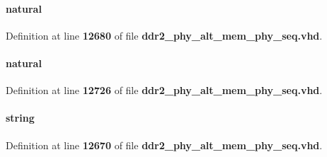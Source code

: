 \paragraph[{D\+W\+I\+D\+T\+H\+\_\+\+R\+A\+T\+IO}]{ {\bfseries \textcolor{vhdlchar}{ }} {\bfseries \textcolor{comment}{natural}\textcolor{vhdlchar}{ }} \hspace{0.3cm}{\ttfamily [Generic]}}\label{classddr2__phy__alt__mem__phy__seq_af28fead9270d0cdddf2692beba1d213f}


Definition at line {\bf 12680} of file {\bf ddr2\+\_\+phy\+\_\+alt\+\_\+mem\+\_\+phy\+\_\+seq.\+vhd}.

\paragraph[{E\+N\+\_\+\+O\+CT}]{ {\bfseries \textcolor{vhdlchar}{ }} {\bfseries \textcolor{comment}{natural}\textcolor{vhdlchar}{ }} \hspace{0.3cm}{\ttfamily [Generic]}}\label{classddr2__phy__alt__mem__phy__seq_a19426c180bed9a86acb8dd5fd27facc5}


Definition at line {\bf 12726} of file {\bf ddr2\+\_\+phy\+\_\+alt\+\_\+mem\+\_\+phy\+\_\+seq.\+vhd}.

\paragraph[{F\+A\+M\+I\+LY}]{ {\bfseries \textcolor{vhdlchar}{ }} {\bfseries \textcolor{comment}{string}\textcolor{vhdlchar}{ }} \hspace{0.3cm}{\ttfamily [Generic]}}\label{classddr2__phy__alt__mem__phy__seq_a70950302800b390fd43b5171824a5e4a}


Definition at line {\bf 12670} of file {\bf ddr2\+\_\+phy\+\_\+alt\+\_\+mem\+\_\+phy\+\_\+seq.\+vhd}.

